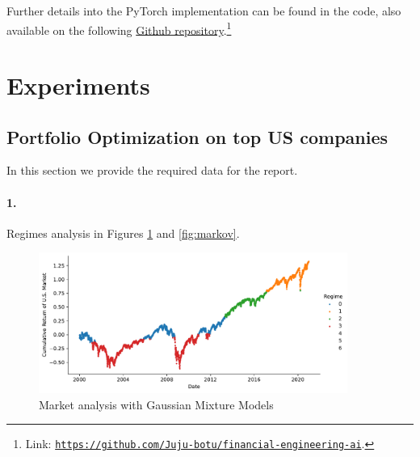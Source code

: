 \documentclass[12pt]{article}
\begin{document}
Further details into the PyTorch \cite{pytorch} implementation can be found in the code, also available on the following \href{https://github.com/Juju-botu/financial-engineering-ai}{Github repository}.\footnote{Link: \href{https://github.com/Juju-botu/financial-engineering-ai}{\tt{https://github.com/Juju-botu/financial-engineering-ai}}.}

\section{Experiments}

\subsection{Portfolio Optimization on top US companies}
In this section we provide the required data for the report.

\paragraph{1.} Regimes analysis in Figures \ref{fig:gmm} and \ref{fig:markov}.

\begin{figure}[h!]
    \centering
    \includegraphics[width=0.9\textwidth]{images/market_gaussian.pdf}
    \caption{Market analysis with Gaussian Mixture Models}
    \label{fig:gmm}
\end{figure}
\end{document}
